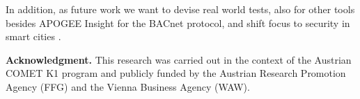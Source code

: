 \documentclass[runningheads]{llncs}
\newcommand{\apogee}{APOGEE Insight\textsuperscript{\tiny{\textregistered}}}
\begin{document}
In addition, as future work we want to devise real world tests,
also for other tools besides \apogee{} for the BACnet protocol,
and shift focus to security in smart cities \cite{SCsecurity}.

{\footnotesize \noindent \textbf{Acknowledgment.} This
research was carried out in the context of the Austrian COMET K1
program and publicly funded by the Austrian Research Promotion
Agency (FFG) and the Vienna Business Agency (WAW).}






\end{document}
